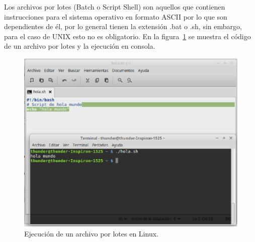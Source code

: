 

Los archivos por lotes (Batch o Script Shell) \cite{Silberschatz1999} son
 aquellos que contienen instrucciones para el sistema operativo en formato
 ASCII por lo que son dependientes de \'el, por lo general tienen la extensi\'on
 .bat o .sh, sin embargo, para el caso de UNIX esto no es obligatorio. En la
 figura~\ref{fig:script} se muestra el c\'odigo de un archivo por lotes y la 
 ejecuci\'on en consola.



\begin{figure}[h]
\centering
\includegraphics[width=0.7\columnwidth]{chap2/Imagenes/Script.eps}
\caption{Ejecuci\'on de un archivo por lotes en Linux.}
\label{fig:script}
\end{figure}